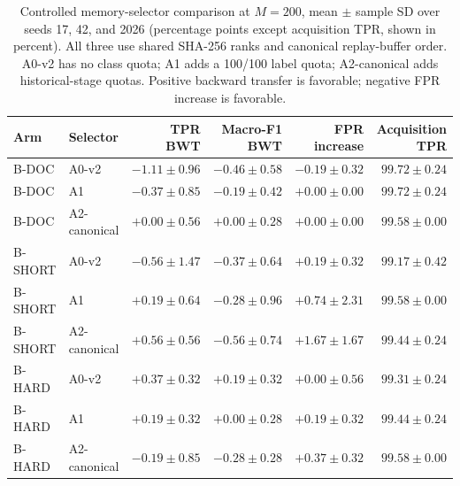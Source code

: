\begin{table}[t]
\caption{Controlled memory-selector comparison at $M=200$, mean $\pm$ sample SD over seeds 17, 42, and 2026 (percentage points except acquisition TPR, shown in percent). All three use shared SHA-256 ranks and canonical replay-buffer order. A0-v2 has no class quota; A1 adds a 100/100 label quota; A2-canonical adds historical-stage quotas. Positive backward transfer is favorable; negative FPR increase is favorable.}
\label{tab:r4-rq3}

\centering
\small
\setlength{\tabcolsep}{4pt}
\begin{tabular}{@{}llrrrr@{}}
\toprule
Arm & Selector & TPR BWT & Macro-F1 BWT & FPR increase & Acquisition TPR \\
\midrule
B-DOC & A0-v2 & $-1.11\pm0.96$ & $-0.46\pm0.58$ & $-0.19\pm0.32$ & $99.72\pm0.24$ \\
B-DOC & A1 & $-0.37\pm0.85$ & $-0.19\pm0.42$ & $+0.00\pm0.00$ & $99.72\pm0.24$ \\
B-DOC & A2-canonical & $+0.00\pm0.56$ & $+0.00\pm0.28$ & $+0.00\pm0.00$ & $99.58\pm0.00$ \\
B-SHORT & A0-v2 & $-0.56\pm1.47$ & $-0.37\pm0.64$ & $+0.19\pm0.32$ & $99.17\pm0.42$ \\
B-SHORT & A1 & $+0.19\pm0.64$ & $-0.28\pm0.96$ & $+0.74\pm2.31$ & $99.58\pm0.00$ \\
B-SHORT & A2-canonical & $+0.56\pm0.56$ & $-0.56\pm0.74$ & $+1.67\pm1.67$ & $99.44\pm0.24$ \\
B-HARD & A0-v2 & $+0.37\pm0.32$ & $+0.19\pm0.32$ & $+0.00\pm0.56$ & $99.31\pm0.24$ \\
B-HARD & A1 & $+0.19\pm0.32$ & $+0.00\pm0.28$ & $+0.19\pm0.32$ & $99.44\pm0.24$ \\
B-HARD & A2-canonical & $-0.19\pm0.85$ & $-0.28\pm0.28$ & $+0.37\pm0.32$ & $99.58\pm0.00$ \\
\bottomrule
\end{tabular}


\end{table}

